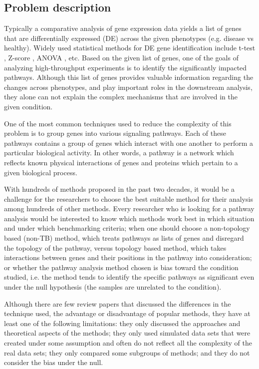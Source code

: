 \subsection{Problem description}
\label{chap:ProblemDescription}

Typically a comparative analysis of gene expression data yields a list of genes that are differentially expressed (DE) across the given phenotypes (e.g. disease vs healthy).
Widely used statistical methods for DE gene identification include t-test \cite{Tian:2005}, Z-score \cite{kim2005page}, ANOVA \cite{al2005discovering}, etc. Based on the given list of genes, one of the goals of analyzing high-throughput experiments is to identify the significantly impacted pathways.
Although this list of genes provides valuable information regarding the changes across phenotypes, and play important roles in the downstream analysis, they alone can not explain the complex mechanisms that are involved in the given condition.

One of the most common techniques used to reduce the complexity of this problem is to group  genes into various signaling pathways.
Each of these pathways contains a group of genes which interact with one another to perform a particular biological activity. 
In other words, a pathway is a network which reflects known physical interactions of genes and proteins which pertain to a given biological process.

With hundreds of methods proposed in the past two decades, it would be a challenge for the researchers to choose the best suitable method for their analysis among hundreds of other methods.
Every researcher who is looking for a pathway analysis would be interested to know which methods work best in which situation and under which benchmarking criteria; when one should choose a non-topology based (non-TB) method, which treats pathways as lists of genes and disregard the topology of the pathway, versus topology based method, which takes interactions between genes and their positions in the pathway into consideration; or whether the pathway analysis method chosen is bias toward the condition studied, i.e. the method tends to identify the specific pathways as significant even under the null hypothesis (the samples are unrelated to the condition).

Although there are few review papers that discussed the differences in the technique used, the advantage or disadvantage of popular methods, they have at least one of the following limitations: they only discussed the approaches and theoretical aspects of the methods; they only used simulated data sets that were created under some assumption and often do not reflect all the complexity of the real data sets; they only compared some subgroups of methods; and they do not consider the bias under the null.


